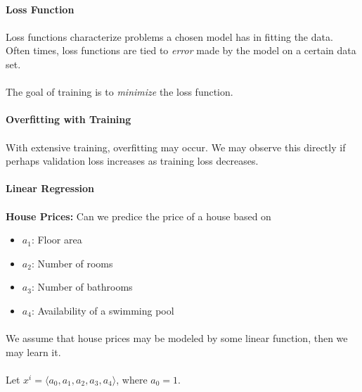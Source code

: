 \documentclass[letterpaper,12pt]{article}
\begin{document}
\paragraph{Loss Function}
\paragraph{}Loss functions characterize problems a chosen model has in fitting the data. Often
times, loss functions are tied to \textit{error} made by the model on a certain data set. 
\paragraph{}The goal of training is to \textit{minimize} the loss function.
\paragraph{Overfitting with Training}
\paragraph{}With extensive training, overfitting may occur. We may observe this directly if perhaps
validation loss increases as training loss decreases.

\paragraph{Linear Regression}
\paragraph{} \textbf{House Prices:} Can we predice the price of a house based on
\begin{itemize}
    \item $a_1$: Floor area
    \item $a_2$: Number of rooms
    \item $a_3$: Number of bathrooms
    \item $a_4$: Availability of a swimming pool
\end{itemize}
\paragraph{}We assume that house prices may be modeled by some linear function, then we may learn it.
\paragraph{} Let $x^i = \langle a_0, a_1, a_2, a_3, a_4 \rangle$, where $a_0 = 1$. 
\end{document}

